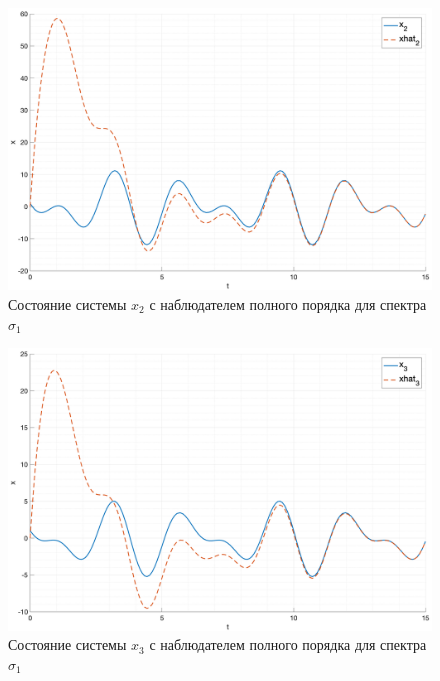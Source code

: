\begin{figure}[ht!]
    \centering
    \includegraphics[width=\textwidth]{media/plots/task2_x2_1.png}
    \caption{Состояние системы $x_2$ с наблюдателем полного порядка для спектра $\sigma_1$}
    \label{fig:task2_x2_1}
\end{figure}

\begin{figure}[ht!]
    \centering
    \includegraphics[width=\textwidth]{media/plots/task2_x3_1.png}
    \caption{Состояние системы $x_3$ с наблюдателем полного порядка для спектра $\sigma_1$}
    \label{fig:task2_x3_1}
\end{figure}

